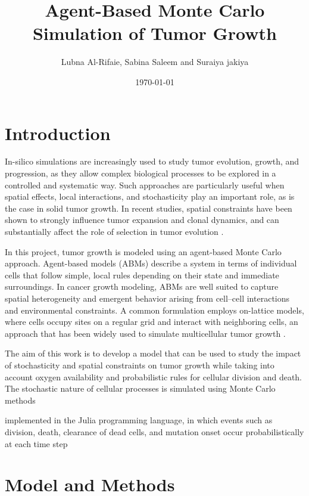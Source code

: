 \documentclass[11pt,a4paper,twoside]{article}
\begin{document}
\title{Agent-Based Monte Carlo Simulation of Tumor Growth}
\author{Lubna Al-Rifaie, Sabina Saleem and Suraiya jakiya}
\date{\today}

\maketitle

\section{Introduction}

In-silico simulations are increasingly used to study tumor evolution, growth, and progression, as they allow complex biological processes to be explored 
in a controlled and systematic way. Such approaches are particularly useful when spatial effects, local interactions, and stochasticity play an important 
role, as is the case in solid tumor growth. In recent studies, spatial constraints have been shown to strongly influence tumor expansion and clonal dynamics,
and can substantially affect the role of selection in tumor evolution \cite{Chkhaidze2019}.

In this project, tumor growth is modeled using an agent-based Monte Carlo approach. Agent-based models (ABMs) describe a system in terms of individual cells
that follow simple, local rules depending on their state and immediate surroundings. In cancer growth modeling, ABMs are well suited to capture spatial heterogeneity
and emergent behavior arising from cell–cell interactions and environmental constraints. A common formulation employs on-lattice models, where cells occupy sites 
on a regular grid and interact with neighboring cells, an approach that has been widely used to simulate multicellular tumor growth \cite{RuizArrebola2020}.

The aim of this work is to develop a model that can be used to study the impact of stochasticity and spatial constraints on tumor growth while taking into account 
oxygen availability and probabilistic rules for cellular division and death. The stochastic nature of cellular processes is simulated using Monte Carlo methods

implemented in the Julia programming language, in which events such as division, death, clearance of dead cells, and mutation onset occur probabilistically at each 
time step


\section{Model and Methods}
\end{document}
